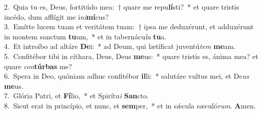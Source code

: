 {2.~}Quia tu es, Deus, fortitúdo mea:~† quare me repu\textbf{lí}sti?~* et quare tristis incédo, dum afflígit me i\textit{ni}\textbf{mí}cus?\\
{3.~}Emítte lucem tuam et veritátem tuam:~† ipsa me deduxérunt, et adduxérunt in montem sanctum \textbf{tu}um,~* et in tabernácu\textit{la} \textbf{tu}a.\\
{4.~}Et introíbo ad altáre \textbf{De}i:~* ad Deum, qui lætíficat juventú\textit{tem} \textbf{me}am.\\
{5.~}Confitébor tibi in cíthara, Deus, Deus \textbf{me}us:~* quare tristis es, ánima mea? et quare \textit{con}\textbf{túr}\textbf{bas} me?\\
{6.~}Spera in Deo, quóniam adhuc confitébor \textbf{il}li:~* salutáre vultus mei, et De\textit{us} \textbf{me}us.\\
{7.~}Glória Patri, et \textbf{Fí}lio,~* et Spirítu\textit{i} \textbf{San}cto.\\
{8.~}Sicut erat in princípio, et nunc, et \textbf{sem}per,~* et in sǽcula sæculó\textit{rum}. \textbf{A}men.\\
